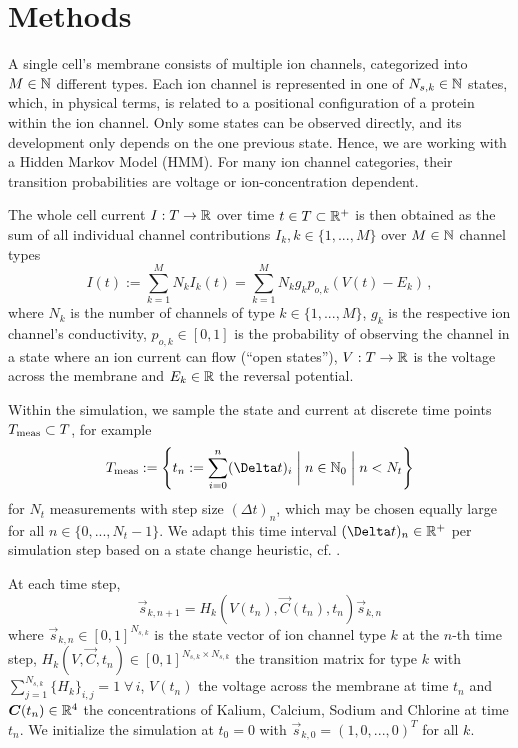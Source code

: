 
\section{Methods}
A single cell's membrane consists of multiple ion channels, categorized into $M \in \mathbb{N}$ different types.
Each ion channel is represented in one of $N_{s, k} \in \mathbb{N}$ states, which, in physical terms, is related to a positional configuration of a protein within the ion channel.
Only some states can be observed directly, and its development only depends on the one previous state.
Hence, we are working with a Hidden Markov Model (HMM).
For many ion channel categories, their transition probabilities are voltage or ion-concentration dependent.

The whole cell current $I: T \rightarrow \mathbb{R}$ over time $t \in T \subset \mathbb{R}^+$ is then obtained as the sum of all individual channel contributions $I_k, k \in \{1, ..., M\}$ over $M \in \mathbb{N}$ channel types
\begin{equation}
  I(t) := \sum_{k=1}^{M} N_k I_k(t) = \sum_{k=1}^{M} N_k g_k p_{o,k} \left(V(t)-E_k\right)\,,
  \label{eq:current}
\end{equation}
where $N_k$ is the number of channels of type $k \in \{1, ..., M\}$, $g_k$ is the respective ion channel's conductivity, $p_{o, k} \in [0, 1]$ is the probability of observing the channel in a state where an ion current can flow (``open states''), $V: T \rightarrow \mathbb{R}$ is the voltage across the membrane and $E_k \in \mathbb{R}$ the reversal potential.

Within the simulation, we sample the state and current at discrete time points $T_{\rm meas} \subset T$, for example
$$T_{\rm meas} := \left\{t_n := \sum_{i=0}^n (\Delta t)_i \;\bigg|\; n \in \N_0 \;\bigg|\; n < N_t\right\}$$
for $N_t$ measurements with step size $(\Delta t)_n$, which may be chosen equally large for all $n \in \{0, ..., N_t - 1\}$.
We adapt this time interval $(\Delta t)_n \in \R^+$ per simulation step based on a state change heuristic, cf. .

At each time step,
\begin{equation}
  \vec{s}_{k,n+1} = H_{k}\left(V(t_n), \vec{C}(t_n), t_n\right) \vec{s}_{k,n}
\end{equation}
where $\vec{s}_{k,n} \in [0, 1]^{N_{s,k}}$ is the state vector of ion channel type $k$ at the $n$-th time step, $H_{k}\left(V, \vec{C}, t_n\right) \in [0, 1]^{N_{s,k} \times N_{s,k}}$ the transition matrix for type $k$ with $\sum_{j=1}^{N_{s,k}} \{H_k\}_{i,j} = 1 \;\forall\,i$, $V(t_n)$ the voltage across the membrane at time $t_n$ and ${\bm{C}}(t_n) \in \mathbb{R}^4$ the concentrations of Kalium, Calcium, Sodium and Chlorine at time $t_n$.
We initialize the simulation at $t_0 = 0$ with $\vec{s}_{k,0} = (1, 0, ..., 0)^T$ for all $k$.


